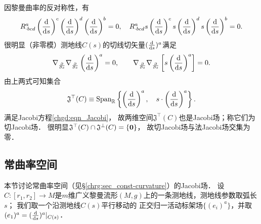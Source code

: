 因黎曼曲率的反对称性，有
\begin{equation*}
    R^{a}_{\cdot bcd} \left(\frac{{\rm d}}{{\rm d}s}\right)^c
    \left(\frac{{\rm d}}{{\rm d}s}\right)^d \left(\frac{{\rm d}}{{\rm d}s}\right)^b =0, \quad
    R^{a}_{\cdot bcd} s\left(\frac{{\rm d}}{{\rm d}s}\right)^c
    s\left(\frac{{\rm d}}{{\rm d}s}\right)^d s\left(\frac{{\rm d}}{{\rm d}s}\right)^b =0   .
\end{equation*}
很明显（非零模）测地线$C(s)$的切线切矢量$(\frac{{\rm d}}{{\rm d}s})^a$满足
\begin{equation*}
    \nabla_{\frac{\partial}{\partial s}} \nabla_{\frac{\partial}{\partial s}}
      \left(\frac{{\rm d}}{{\rm d}s}\right)^a =0, \qquad
    \nabla_{\frac{\partial}{\partial s}} \nabla_{\frac{\partial}{\partial s}}
      \left[s \left(\frac{{\rm d}}{{\rm d}s}\right)^a\right] =0  .
\end{equation*}
由上两式可知集合
\begin{equation}
    \mathfrak{J}^{\top}(C) \equiv {\rm Span}_{\mathbb{R}} 
    \left\{\left(\frac{{\rm d}}{{\rm d}s}\right)^a, \quad
    s\cdot \left(\frac{{\rm d}}{{\rm d}s}\right)^a\right\} .
\end{equation}
满足Jacobi方程\eqref{chgd:eqn_Jacobi}，
故两维空间$\mathfrak{J}^{\top}(C)$也是Jacobi场；称它们为切Jacobi场．
很明显$\mathfrak{J}^{\top}(C) \cap \mathfrak{J}^{\bot}(C) = \{{\bf 0}\}$，
故切Jacobi场与法Jacobi场交集为零．



\subsection{常曲率空间}
本节讨论常曲率空间（见\S \ref{chrg:sec_const-curvature}）的Jacobi场．
设$C:[r_1,r_2]\to M$是$m$维广义黎曼流形$(M,g)$上的一条测地线，测地线参数取弧长$s$；
我们取一个沿测地线$C(s)$平行移动的
正交归一活动标架场$\{(e_i)^a\}$，并取$(e_1)^a=(\frac{{\rm d}}{{\rm d}s})^a|_{C(s)}$．

